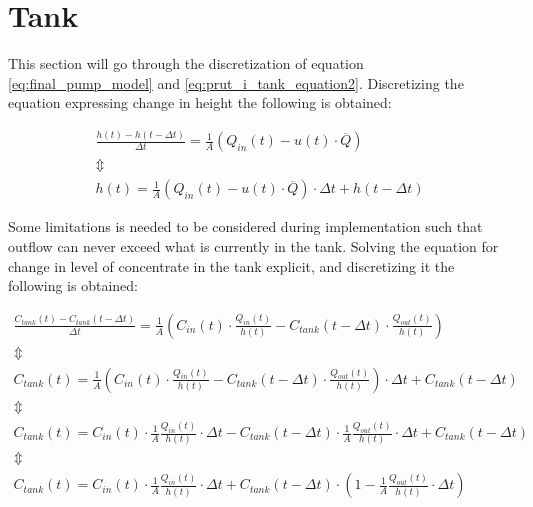 \section{Tank}\label{sec:tank}

This section will go through the discretization of equation \ref{eq:final_pump_model} and \ref{eq:prut_i_tank_equation2}.
Discretizing the equation expressing change in height the following is obtained:

\begin{equation}\label{eq:disc_tank}
\begin{array}{l}
	\frac{h(t)-h(t-\Delta t)}{\Delta t} = \frac{1}{A} (Q_{in}(t) - u(t)\cdot \overline Q) \\
	\Updownarrow \\
	h(t) = \frac{1}{A} (Q_{in}(t) - u(t)\cdot \overline Q) \cdot \Delta t + h(t-\Delta t)	
\end{array}
\end{equation}

Some limitations is needed to be considered during implementation such that outflow can never exceed what is currently in the tank.
Solving the equation for change in level of concentrate in the tank explicit, and discretizing it the following is obtained:

\begin{equation}\label{eq:disc_con_tank}
\begin{array}{l}
	\frac{C_{tank}(t)-C_{tank}(t-\Delta t)}{\Delta t} = \frac{1}{A} \left(C_{in}(t) \cdot \frac{Q_{in}(t)}{h(t)} - C_{tank}(t - \Delta t) \cdot \frac{Q_{out}(t)}{h(t)} \right) \\
	
	\Updownarrow \\
	
	C_{tank}(t) = \frac{1}{A} \left(C_{in}(t) \cdot \frac{Q_{in}(t)}{h(t)} - C_{tank}(t - \Delta t) \cdot \frac{Q_{out}(t)}{h(t)} \right) \cdot \Delta t + C_{tank}(t-\Delta t) \\

	\Updownarrow \\

	C_{tank}(t) =  C_{in}(t) \cdot \frac{1}{A} \frac{Q_{in}(t)}{h(t)} \cdot \Delta t -  C_{tank}(t - \Delta t) \cdot \frac{1}{A} \frac{Q_{out}(t)}{h(t)} \cdot \Delta t + C_{tank}(t - \Delta t) \\

	\Updownarrow \\

	C_{tank}(t) =   C_{in}(t) \cdot \frac{1}{A} \frac{Q_{in}(t)}{h(t)} \cdot \Delta t +  C_{tank}(t - \Delta t) \cdot \left( 1 - \frac{1}{A} \frac{Q_{out}(t)}{h(t)} \cdot \Delta t \right)

\end{array}
\end{equation}

